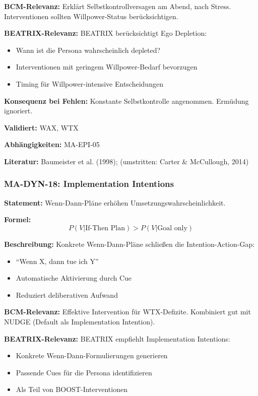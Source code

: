 \textbf{BCM-Relevanz:}
Erklärt Selbstkontrollversagen am Abend, nach Stress. Interventionen sollten Willpower-Status berücksichtigen.

\textbf{BEATRIX-Relevanz:}
BEATRIX berücksichtigt Ego Depletion:
\begin{itemize}
    \item Wann ist die Persona wahrscheinlich depleted?
    \item Interventionen mit geringem Willpower-Bedarf bevorzugen
    \item Timing für Willpower-intensive Entscheidungen
\end{itemize}

\textbf{Konsequenz bei Fehlen:}
Konstante Selbstkontrolle angenommen. Ermüdung ignoriert.

\textbf{Validiert:} WAX, WTX

\textbf{Abhängigkeiten:} MA-EPI-05

\textbf{Literatur:} Baumeister et al. (1998); (umstritten: Carter \& McCullough, 2014)


\subsubsection*{MA-DYN-18: Implementation Intentions}

\textbf{Statement:} Wenn-Dann-Pläne erhöhen Umsetzungswahrscheinlichkeit.

\textbf{Formel:}
\begin{equation}
P(V|\text{If-Then Plan}) > P(V|\text{Goal only})
\end{equation}

\textbf{Beschreibung:}
Konkrete Wenn-Dann-Pläne schließen die Intention-Action-Gap:
\begin{itemize}
    \item ``Wenn X, dann tue ich Y''
    \item Automatische Aktivierung durch Cue
    \item Reduziert deliberativen Aufwand
\end{itemize}

\textbf{BCM-Relevanz:}
Effektive Intervention für WTX-Defizite. Kombiniert gut mit NUDGE (Default als Implementation Intention).

\textbf{BEATRIX-Relevanz:}
BEATRIX empfiehlt Implementation Intentions:
\begin{itemize}
    \item Konkrete Wenn-Dann-Formulierungen generieren
    \item Passende Cues für die Persona identifizieren
    \item Als Teil von BOOST-Interventionen
\end{itemize}


